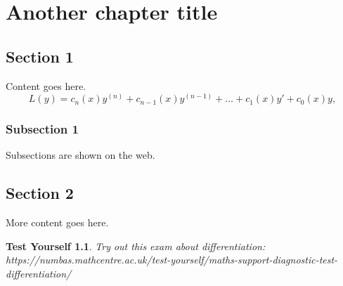 \documentclass[a4paper]{report}
\newtheorem{nmbs_int}{Test Yourself}[section]
\newenvironment{numbas}[1][Visit the URL below to try a numbas exam:]{\begin{nmbs_int}\textrm{#1}\\}{\end{nmbs_int}}
\begin{document}
\setcounter{chapter}{1}
\chapter{Another chapter title}

\section{Section 1}
Content goes here.
\begin{equation}
\label{eqn:intro:linearo}
L(y)= c_n(x)y^{(n)} + c_{n-1}(x)y^{(n-1)}+\ldots + c_1(x)y' + c_0(x)y,
\end{equation}

\subsection{Subsection 1}
Subsections are shown on the web.
\section{Section 2}
More content goes here.

\begin{numbas}[Try out this exam about differentiation:]
https://numbas.mathcentre.ac.uk/test-yourself/maths-support-diagnostic-test-differentiation/
\end{numbas}
\end{document}
